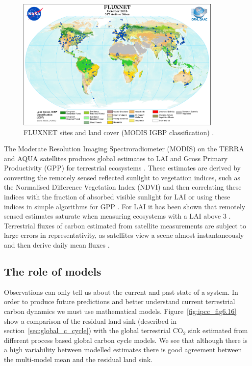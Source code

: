 \begin{figure}[ht]
\centering
\includegraphics[width=0.9\textwidth]{./img/intro/FluxNetworkMODIS_IGBP_10-2015.png}
\caption[FLUXNET sites]{FLUXNET sites and land cover (MODIS IGBP classification) \citep{fluxnetsite2013}.}
\label{fig:fluxnet_2015}
\end{figure}

The Moderate Resolution Imaging Spectroradiometer (MODIS) on the TERRA and AQUA satellites produces global estimates to LAI and Gross Primary Productivity (GPP) for terrestrial ecosystems \citep{running2004continuous}. These estimates are derived by converting the remotely sensed reflected sunlight to vegetation indices, such as the Normalised Difference Vegetation Index (NDVI) and then correlating these indices with the fraction of absorbed visible sunlight for LAI or using these indices in simple algorithms for GPP \citep{yuan2007deriving}. For LAI it has been shown that remotely sensed estimates saturate when measuring ecosystems with a LAI above 3 \citep{myneni2002global}. Terrestrial fluxes of carbon estimated from satellite measurements are subject to large errors in representativity, as satellites view a scene almost instantaneously and then derive daily mean fluxes \citep{baldocchi2008turner}. 

\subsection{The role of models}

Observations can only tell us about the current and past state of a system. In order to produce future predictions and better understand current terrestrial carbon dynamics we must use mathematical models. Figure~\ref{fig:ipcc_fig6.16} show a comparison of the residual land sink (described in section~\ref{sec:global_c_cycle}) with the global terrestrial CO\(_{2}\) sink estimated from different process based global carbon cycle models. We see that although there is a high variability between modelled estimates there is good agreement between the multi-model mean and the residual land sink. 

